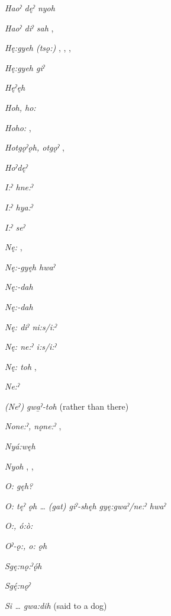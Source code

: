 \begin{multicols}{2}
\textit{Haoˀ dęˀ nyoh} 

\textit{Haoˀ diˀ sah} , 

\textit{Hę:gyeh (tsǫ:)} , , , 

\textit{Hę:gyeh giˀ} 

\textit{Hęˀęh} 

\textit{Hoh, ho:} 

\textit{Hoho:} , 

\textit{Hotgǫˀǫh, otgǫˀ} , 

\textit{Hoˀdęˀ} 

\textit{I:ˀ hne:ˀ} 

\textit{I:ˀ hya:ˀ} 

\textit{I:ˀ seˀ} 

\textit{Nę:} , 

\textit{Nę:-gyęh hwaˀ} 

\textit{Nę:-dah} 

\textit{Nę:-dah} 

\textit{Nę: diˀ ni:s/i:ˀ} 

\textit{Nę: ne:ˀ i:s/i:ˀ} 

\textit{Nę: toh} , 

\textit{Ne:ˀ} 

\textit{(Neˀ) gwa̱ˀ-toh}  (rather than there)

\textit{None:ˀ, nǫne:ˀ} , 

\textit{Nyá:węh} 

\textit{Nyoh} , , 

\textit{O: gęh?} 

\textit{O: tęˀ ǫh … (gat) giˀ-shęh gyę:gwaˀ/ne:ˀ hwaˀ} 

\textit{O:, ó:ò:} 

\textit{Oˀ-ǫ:, o: ǫh} 

\textit{Sgę:nǫ:ˀǫ́h} 

\textit{Sgę́:nǫˀ} 

\textit{Si … gwa:dih}  (said to a dog)


\end{multicols}
